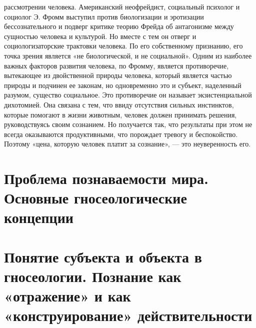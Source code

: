 \documentclass[12pt]{article}
\begin{document}
рассмотрении человека.
Американский неофрейдист, социальный психолог и социолог Э. Фромм выступил против биологизации и
эротизации бессознательного и подверг критике теорию Фрейда об антагонизме между сущностью человека и
культурой.  Но  вместе  с  тем  он  отверг  и  социологизаторские  трактовки  человека.  По  его  собственному
признанию,  его  точка  зрения  является  «не  биологической,  и  не  социальной».  Одним  из  наиболее  важных
факторов  развития  человека,  по  Фромму,  является  противоречие,  вытекающее  из  двойственной  природы
человека,  который  является  частью  природы  и  подчинен  ее  законам,  но  одновременно  это  и  субъект,
наделенный разумом, существо социальное. Это противоречие он называет экзистенциальной дихотомией. Она
связана  с  тем,  что  ввиду  отсутствия  сильных  инстинктов,  которые  помогают  в  жизни  животным,  человек
должен принимать решения, руководствуясь своим сознанием. Но получается так, что результаты при этом не
всегда оказываются продуктивными, что порождает тревогу и беспокойство. Поэтому «цена, которую человек
платит за сознание», — это неуверенность его.


\newpage
\section{Проблема познаваемости мира. Основные гносеологические концепции}


\newpage
\section{Понятие субъекта и объекта в гносеологии. Познание как «отражение» и как «конструирование» действительности}
\end{document}
